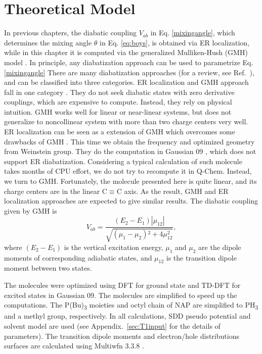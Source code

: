 \section{Theoretical Model} %
In previous chapters, the diabatic coupling $V_{ab}$ in Eq. \ref{mixingangle}, which determines the mixing angle $\theta$ in Eq. \ref{eq:boys}, is obtained via ER localization, while in this chapter it is computed via the generalized Mulliken-Hush (GMH) model \cite{cave1996generalization,cave1997calculation}. In principle, any diabatization approach can be used to parametrize Eq. \ref{mixingangle} There are many diabatization approaches (for a review, see Ref.~\cite{domcke2004conical}), and can be classified into three categories. ER localization and GMH approach fall in one category \cite{subotnik2008constructing,subotnik2009initial}. They do not seek diabatic states with zero derivative couplings, which are expensive to compute. Instead, they rely on physical intuition. GMH works well for linear or near-linear systems, but does not generalize to noncollinear system with more than two charge centers very well. ER localization can be seen as a extension of GMH which overcomes some drawbacks of GMH \cite{subotnik2009initial}. This time we obtain the  frequency and optimized geometry from Weinstein group. They do the computation in Gaussian 09 \cite{g09}, which does not support ER diabatization. Considering a typical calculation of such molecule takes months of CPU effort, we do not try to recompute it in Q-Chem. Instead, we turn to GMH. Fortunately, the molecule presented here is quite linear, and its charge centers are in the linear C$\equiv$C axis. As the result, GMH and ER localization approaches are expected to give similar results. The diabatic coupling given by GMH is
$$V_{ab}=\frac{\left(E_2-E_1\right) \left|\mu _{12}\right|}{\sqrt{\left(\mu _1-\mu _2\right){}^2+4 \mu _{12}^2}},$$
where $\left(E_2-E_1\right)$ is the vertical excitation energy, $\mu _1$ and $\mu _2$ are the dipole moments of corresponding adiabatic states, and $\mu _{12}$ is the transition dipole moment between two states.

The molecules were optimized using DFT for ground state and TD-DFT for excited states
in Gaussian 09. The molecules are simplified to speed up the  computations. The P(Bu)\textsubscript{3} moieties and octyl chain of NAP are simplified to PH\textsubscript{3} and a methyl group, respectively. In all calculations, SDD pseudo potential and solvent model are used (see Appendix.~\ref{sec:T1input} for the details of parameters). The transition dipole moments and electron/hole distributions surfaces are calculated using Multiwfn 3.3.8 \cite{lu2012multiwfn}.

